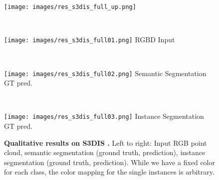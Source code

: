 \documentclass[runningheads]{llncs}
\newcommand{\rulesep}{\unskip\ \vrule\ }
\begin{document}
{\begin{figure}
\centering
\begin{minipage}[t]{\linewidth}
\centering
\texttt{[image: images/res\_s3dis\_full\_up.png]}
\end{minipage}\\
\begin{minipage}[t]{.185\linewidth}
\centering
\texttt{[image: images/res\_s3dis\_full01.png]}
RGBD Input
\end{minipage}
    \rulesep
\begin{minipage}[t]{.37\linewidth}
\centering
\texttt{[image: images/res\_s3dis\_full02.png]}
Semantic Segmentation \\
GT \hspace{10mm} pred.
\end{minipage}
    \rulesep
\begin{minipage}[t]{.37\linewidth}
\centering
\texttt{[image: images/res\_s3dis\_full03.png]}
Instance Segmentation \\
GT \hspace{10mm} pred.
\end{minipage}
    \caption{\textbf{Qualitative results on S3DIS \cite{Armeni16CVPR}.} Left to right: Input RGB point cloud, semantic segmentation (ground truth, prediction), instance segmentation (ground truth, prediction). While we have a fixed color for each class, the color mapping for the single instances is arbitrary.}
      \label{fig:s3dis_qualitative_results}
\end{figure}

}
\end{document}

